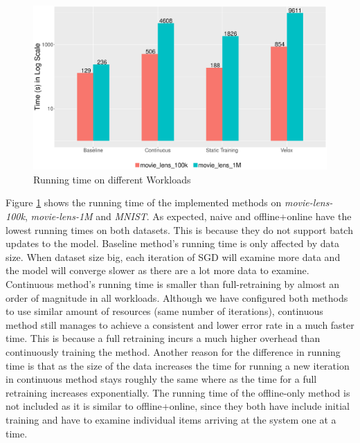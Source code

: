 \documentclass{vldb}
\begin{document}
\begin{figure}[h]
\centering
\includegraphics[width=\columnwidth]{../images/experiment-results/times-log-scale-improved.eps}
 \caption{Running time on different Workloads}
 \label{fig:running-time}
 \end{figure}
Figure \ref{fig:running-time} shows the running time of the implemented methods on \textit{movie-lens-100k}, \textit{movie-lens-1M} and \textit{MNIST}.
As expected, naive and offline+online have the lowest running times on both datasets.
This is because they do not support batch updates to the model.
Baseline method's running time is only affected by data size.
When dataset size big, each iteration of SGD will examine more data and the model will converge slower as there are a lot more data to examine.
Continuous method's running time is smaller than full-retraining by almost an order of magnitude in all workloads.
Although we have configured both methods to use similar amount of resources (same number of iterations), continuous method still manages to achieve a consistent and lower error rate in a much faster time.
This is because a full retraining incurs a much higher overhead than continuously training the method.
Another reason for the difference in running time is that as the size of the data increases the time for running a new iteration in continuous method stays roughly the same where as the time for a full retraining increases exponentially.
The running time of the offline-only method is not included as it is similar to offline+online, since they both have include initial training and have to examine individual items arriving at the system one at a time.
\end{document}
